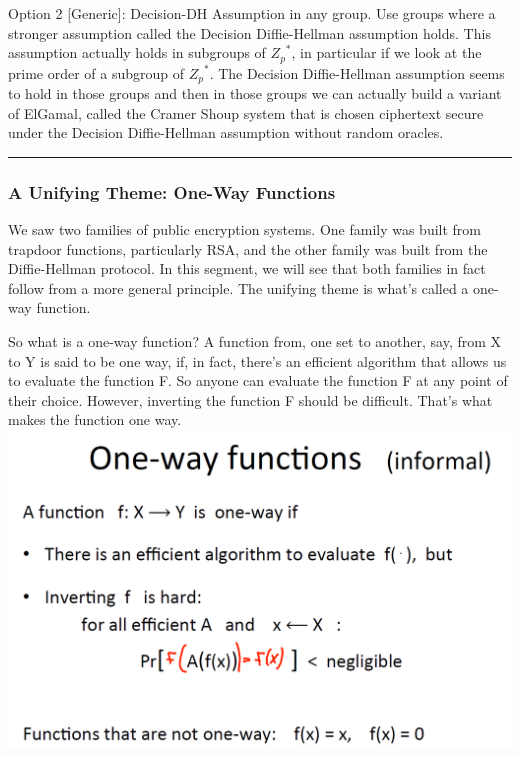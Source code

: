 \documentclass[11pt]{article}
\makeatletter
\def\maxwidth{\ifdim\Gin@nat@width>\linewidth\linewidth
    \else\Gin@nat@width\fi}
\let\Oldincludegraphics\includegraphics
\renewcommand{\includegraphics}[1]{\Oldincludegraphics[width=.8\maxwidth]{#1}}
\makeatother
\begin{document}
Option 2 {[}Generic{]}: Decision-DH Assumption in any group. Use groups
where a stronger assumption called the Decision Diffie-Hellman
assumption holds. This assumption actually holds in subgroups of
\({Z_p}^{*}\), in particular if we look at the prime order of a subgroup
of \({Z_p}^{*}\). The Decision Diffie-Hellman assumption seems to hold
in those groups and then in those groups we can actually build a variant
of ElGamal, called the Cramer Shoup system that is chosen ciphertext
secure under the Decision Diffie-Hellman assumption without random
oracles.

\begin{center}\rule{0.5\linewidth}{\linethickness}\end{center}

\hypertarget{a-unifying-theme-one-way-functions}{%
\subsubsection{A Unifying Theme: One-Way
Functions}\label{a-unifying-theme-one-way-functions}}

We saw two families of public encryption systems. One family was built
from trapdoor functions, particularly RSA, and the other family was
built from the Diffie-Hellman protocol. In this segment, we will see
that both families in fact follow from a more general principle. The
unifying theme is what's called a one-way function.

So what is a one-way function? A function from, one set to another, say,
from X to Y is said to be one way, if, in fact, there's an efficient
algorithm that allows us to evaluate the function F. So anyone can
evaluate the function F at any point of their choice. However, inverting
the function F should be difficult. That's what makes the function one
way. \includegraphics{./Images/1WayFunc.png}
\end{document}
